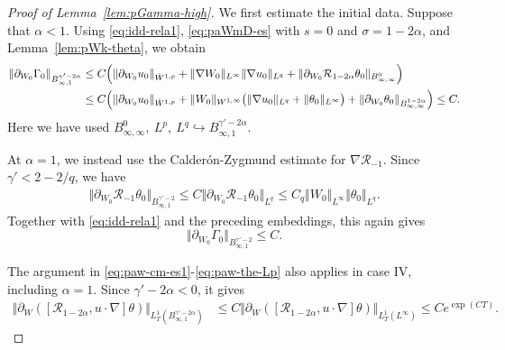 \documentclass[reqno,11pt,a4paper]{amsart}
\begin{document}
\begin{proof}[Proof of Lemma~\ref{lem:pGamma-high}]
We first estimate the initial data.
Suppose that $\alpha<1$.
Using \eqref{eq:idd-rela1},
\eqref{eq:paWmD-es} with $s=0$ and $\sigma=1-2\alpha$,
and Lemma~\ref{lem:pWk-theta}, we obtain
\begin{align*}
  \Vert \partial_{W_0}\Gamma_0
    \Vert _{B^{\gamma'-2\alpha}_{\infty,1}}
  &\leq C\Bigl(
    \Vert \partial_{W_0}u_0\Vert _{\dot W^{1,p}}
    +\Vert \nabla W_0\Vert _{L^\infty}\Vert \nabla u_0\Vert _{L^q}
  +  \Vert \partial_{W_0}\mathcal R_{1-2\alpha}\theta_0
      \Vert _{B^0_{\infty,\infty}}
  \Bigr)
  \\
  &\leq C\Bigl(
    \Vert \partial_{W_0}u_0\Vert _{\dot W^{1,p}}
    +\Vert W_0\Vert _{W^{1,\infty}}
      \bigl(\Vert \nabla u_0\Vert _{L^q}
            +\Vert \theta_0\Vert _{L^\infty}\bigr)
    +  \Vert \partial_{W_0}\theta_0
      \Vert _{B^{1-2\alpha}_{\infty,\infty}}
  \Bigr)
  \leq C.
\end{align*}
Here we have used
$B^0_{\infty,\infty},\ L^p,\ L^q \hookrightarrow B^{\gamma'-2\alpha}_{\infty,1}$.

At $\alpha=1$, we instead use the
Calder\'on-Zygmund estimate for $\nabla\mathcal R_{-1}$.
Since $\gamma'<2-2/q$, we have
\begin{align*}
  \Vert \partial_{W_0}\mathcal R_{-1}\theta_0
    \Vert _{B^{\gamma'-2}_{\infty,1}}
  \leq
  C\Vert \partial_{W_0}\mathcal R_{-1}\theta_0\Vert _{L^q}
  \leq
  C_q\Vert W_0\Vert _{L^\infty}\Vert \theta_0\Vert _{L^q}.
\end{align*}
Together with \eqref{eq:idd-rela1} and the preceding
embeddings, this again gives
\[
  \Vert \partial_{W_0}\Gamma_0
    \Vert _{B^{\gamma'-2}_{\infty,1}}
  \leq C.
\]

The argument in
\eqref{eq:paw-cm-es1}-\eqref{eq:paw-the-Lp}
also applies in case IV, including $\alpha=1$.
Since $\gamma'-2\alpha<0$, it gives
\begin{align*}
  \Vert \partial_W(
    [\mathcal R_{1-2\alpha},u\cdot\nabla]\theta)
    \Vert _{L^1_T(B^{\gamma'-2\alpha}_{\infty,1})}
  &\leq
  C\Vert \partial_W(
    [\mathcal R_{1-2\alpha},u\cdot\nabla]\theta)
    \Vert _{L^1_T(L^\infty)}
  \leq Ce^{\exp(CT)}.
\end{align*}


\end{proof}
\end{document}
